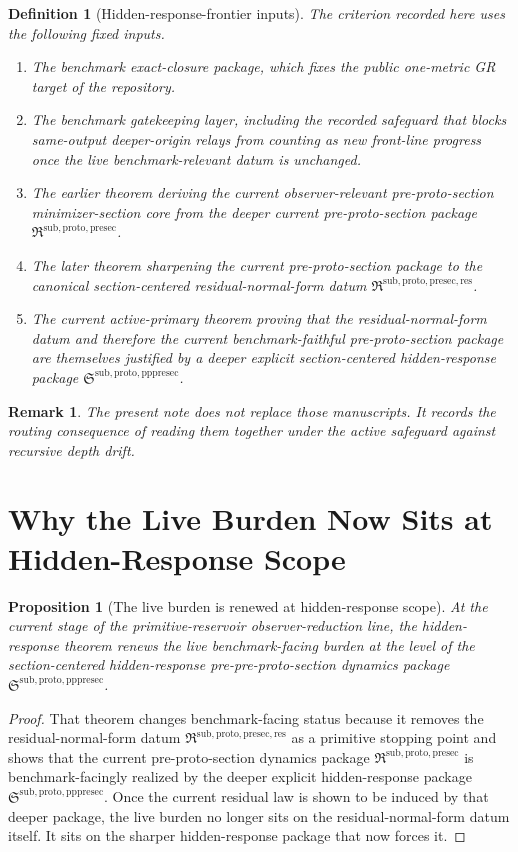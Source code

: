 \documentclass[11pt]{article}
\newcommand{\PreProtoSectionPackage}{\mathfrak R^{\mathrm{sub,proto,presec}}}
\newcommand{\PreProtoSectionResidualPackage}{\mathfrak R^{\mathrm{sub,proto,presec,res}}}
\newcommand{\PrePreProtoSectionPackage}{\mathfrak S^{\mathrm{sub,proto,pppresec}}}
\newtheorem{definition}{Definition}
\newtheorem{proposition}{Proposition}
\newtheorem{remark}{Remark}
\begin{document}
\begin{definition}[Hidden-response-frontier inputs]
The criterion recorded here uses the following fixed inputs.
\begin{enumerate}
    \item The benchmark exact-closure package, which fixes the public one-metric GR target of the repository.
    \item The benchmark gatekeeping layer, including the recorded safeguard that blocks same-output deeper-origin relays from counting as new front-line progress once the live benchmark-relevant datum is unchanged.
    \item The earlier theorem deriving the current observer-relevant pre-proto-section minimizer-section core from the deeper current pre-proto-section package \(\PreProtoSectionPackage\).
    \item The later theorem sharpening the current pre-proto-section package to the canonical section-centered residual-normal-form datum \(\PreProtoSectionResidualPackage\).
    \item The current active-primary theorem proving that the residual-normal-form datum and therefore the current benchmark-faithful pre-proto-section package are themselves justified by a deeper explicit section-centered hidden-response package \(\PrePreProtoSectionPackage\).
\end{enumerate}
\end{definition}

\begin{remark}
The present note does not replace those manuscripts. It records the routing consequence of reading them together under the active safeguard against recursive depth drift.
\end{remark}

\section{Why the Live Burden Now Sits at Hidden-Response Scope}

\begin{proposition}[The live burden is renewed at hidden-response scope]
At the current stage of the primitive-reservoir observer-reduction line, the hidden-response theorem renews the live benchmark-facing burden at the level of the section-centered hidden-response pre-pre-proto-section dynamics package \(\PrePreProtoSectionPackage\).
\end{proposition}

\begin{proof}
That theorem changes benchmark-facing status because it removes the residual-normal-form datum \(\PreProtoSectionResidualPackage\) as a primitive stopping point and shows that the current pre-proto-section dynamics package \(\PreProtoSectionPackage\) is benchmark-facingly realized by the deeper explicit hidden-response package \(\PrePreProtoSectionPackage\). Once the current residual law is shown to be induced by that deeper package, the live burden no longer sits on the residual-normal-form datum itself. It sits on the sharper hidden-response package that now forces it.
\end{proof}
\end{document}
